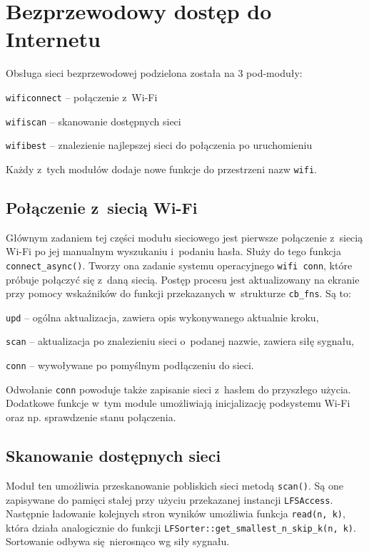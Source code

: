 \documentclass[polish]{aghengthesis}
\let\tempone\itemize
\let\temptwo\enditemize
\renewenvironment{itemize}{\tempone\setlength{\itemsep}{0cm}}{\temptwo}
\begin{document}
	\section{Bezprzewodowy dostęp do Internetu}
		Obsługa sieci bezprzewodowej podzielona została na 3 pod-moduły:
		\begin{itemize}
			\item \lstinline|wificonnect| -- połączenie z~Wi-Fi
			\item \lstinline|wifiscan| -- skanowanie dostępnych sieci
			\item \lstinline|wifibest| -- znalezienie najlepszej sieci do połączenia po uruchomieniu
		\end{itemize}
		
		Każdy z~tych modułów dodaje nowe funkcje do przestrzeni nazw \lstinline|wifi|.
		
		\subsection{Połączenie z~siecią Wi-Fi}
			Głównym zadaniem tej części modułu sieciowego jest pierwsze połączenie z~siecią Wi-Fi po jej manualnym wyszukaniu i~podaniu hasła. Służy do tego funkcja \lstinline|connect_async()|. Tworzy ona zadanie systemu operacyjnego \lstinline|wifi conn|, które próbuje połączyć się z~daną siecią. Postęp procesu jest aktualizowany na ekranie przy pomocy wskaźników do funkcji przekazanych w~strukturze \lstinline|cb_fns|. Są to:
			\begin{itemize}
				\item \lstinline|upd| -- ogólna aktualizacja, zawiera opis wykonywanego aktualnie kroku,
				\item \lstinline|scan| -- aktualizacja po znalezieniu sieci o~podanej nazwie, zawiera siłę sygnału,
				\item \lstinline|conn| -- wywoływane po pomyślnym podłączeniu do sieci.
			\end{itemize}
			
			Odwołanie \lstinline|conn| powoduje także zapisanie sieci z~hasłem do przyszłego użycia. Dodatkowe funkcje w~tym module umożliwiają inicjalizację podsystemu Wi-Fi oraz np. sprawdzenie stanu połączenia.
			
		\subsection{Skanowanie dostępnych sieci}
			Moduł ten umożliwia przeskanowanie pobliskich sieci metodą \lstinline|scan()|. Są one zapisywane do pamięci stałej przy użyciu przekazanej instancji \lstinline|LFSAccess|. Następnie ładowanie kolejnych stron wyników umożliwia funkcja \lstinline|read(n, k)|, która działa analogicznie do funkcji \lstinline|LFSorter::get_smallest_n_skip_k(n, k)|. Sortowanie odbywa się nierosnąco wg siły sygnału.
			
\end{document}
